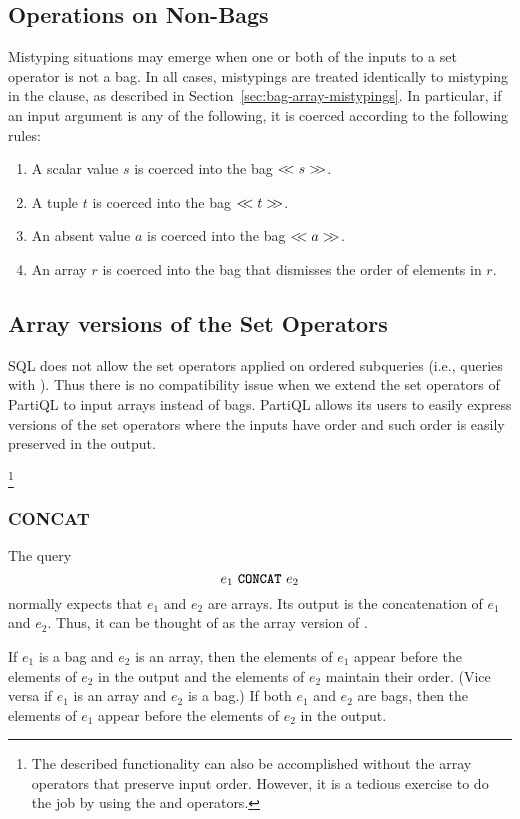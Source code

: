 {\subsection{Operations on Non-Bags}
\label{sec:setops-on-non-bags}
Mistyping situations may emerge when one or both of the inputs to a set operator
is not a bag. In all cases, mistypings are treated identically to mistyping in
the  clause, as described in Section~\ref{sec:bag-array-mistypings}. In
particular, if an input argument is any of the following, it is coerced
according to the following rules:

\begin{enumerate}
\item A scalar value $s$ is coerced into the bag $<\!\!< s >\!\!>$.
\item A tuple $t$ is coerced into the bag $<\!\!< t >\!\!>$.
\item An absent value $a$ is coerced into the bag $<\!\!< a >\!\!>$.
\item An array $r$ is coerced into the bag that dismisses the order of elements
in $r$.
\end{enumerate}

\subsection{Array versions of the Set Operators}
\label{sec:array-versions-of-setops}
SQL does not allow the set operators applied on ordered subqueries (i.e.,
queries with ). Thus there is no compatibility issue when we extend
the set operators of PartiQL to input arrays instead of bags. PartiQL allows its
users to easily express versions of the set operators where the inputs have
order and such order is easily preserved in the output.%

\footnote{The described functionality can also be accomplished without the array
operators that preserve input order. However, it is a tedious exercise to do the
job by using the  and  operators.}

\subsubsection{CONCAT} 
\label{sec:concat}
The query 
\[e_1\ \texttt{\textbf{CONCAT}}\ e_2\] \noindent normally expects that $e_1$ and $e_2$ are
arrays. Its output is the concatenation of $e_1$ and $e_2$. Thus, it can be
thought of as the array version of .

If $e_1$ is a bag and $e_2$ is an array, then the elements of $e_1$ appear
before the elements of $e_2$ in the output and the elements of $e_2$ maintain
their order. (Vice versa if $e_1$ is an array and $e_2$ is a bag.) If both $e_1$
and $e_2$ are bags, then the elements of $e_1$ appear before the elements of
$e_2$ in the output.

}
